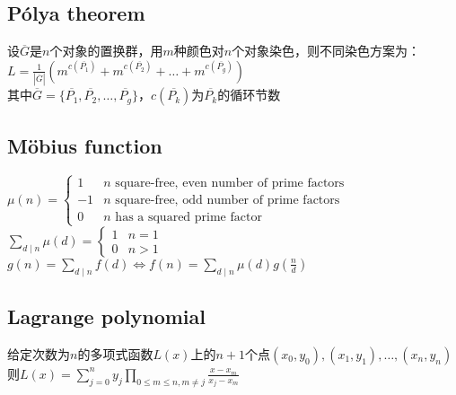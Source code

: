     \subsection*{Pólya theorem}
        设$ \overline{G} $是$ n $个对象的置换群，用$ m $种颜色对$ n $个对象染色，则不同染色方案为：
        \\$ L = \frac{1}{\left| \overline{G} \right|} (m^{c(\overline{P_1})} + m^{c(\overline{P_2})} + \dots + m^{c(\overline{P_g})}) $
        \\其中$ \overline{G} = \lbrace \overline{P_1}, \overline{P_2}, \dots, \overline{P_g} \rbrace $，$ c(\overline{P_k}) $为$ \overline{P_k} $的循环节数
	\subsection*{Möbius function}
		$ \mu(n) = \begin{cases}
			1 & n \text{ square-free, even number of prime factors}\\
			-1 & n \text{ square-free, odd number of prime factors}\\
			0 & n \text{ has a squared prime factor}
		\end{cases} $
		\\$ \sum\limits_{d \mid n} \mu(d) = \begin{cases}
			1 & n = 1\\
			0 & n > 1
		\end{cases} $
		\\$ g(n) = \sum\limits_{d \mid n} f(d) \Leftrightarrow f(n) = \sum\limits_{d \mid n} \mu(d) g(\frac{n}{d}) $
	\subsection*{Lagrange polynomial}
		给定次数为$ n $的多项式函数$ L(x) $上的$ n + 1 $个点$ (x_0, y_0), (x_1, y_1), \dots, (x_n, y_n) $
		\\则$ L(x) = \sum\limits_{j = 0}^{n} y_j \prod\limits_{0 \leq m \leq n, m \ne j} \frac{x - x_m}{x_j - x_m} $

